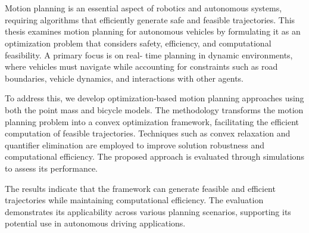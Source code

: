 \chapter{\abstractname}
Motion planning is an essential aspect of robotics and autonomous systems, requiring algorithms that efficiently generate safe and feasible
trajectories.
This thesis examines motion planning for autonomous vehicles by formulating it as an optimization problem that considers safety, efficiency, and
computational feasibility.
A primary focus is on real- time planning in dynamic environments, where vehicles must navigate while accounting for constraints such as road
boundaries, vehicle dynamics, and interactions with other agents.

To address this, we develop optimization-based motion planning approaches using both the point mass and bicycle models.
The methodology transforms the motion planning problem into a convex optimization framework, facilitating the efficient computation of feasible
trajectories.
Techniques such as convex relaxation and quantifier elimination are employed to improve solution robustness and computational efficiency.
The proposed approach is evaluated through simulations to assess its performance.

The results indicate that the framework can generate feasible and efficient trajectories while maintaining computational efficiency.
The evaluation demonstrates its applicability across various planning scenarios, supporting its potential use in autonomous driving applications.
